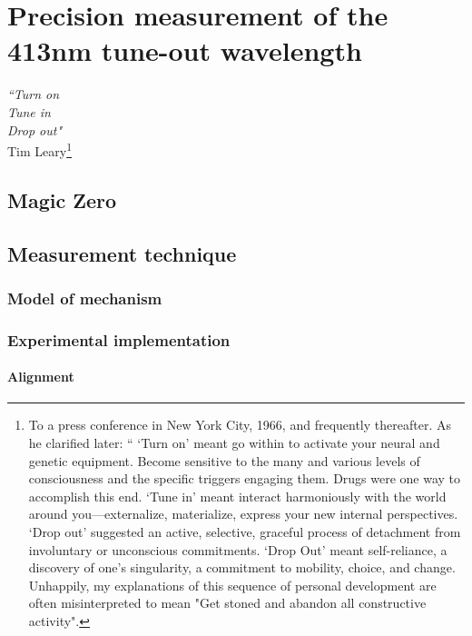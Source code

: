 
\chapter{Precision measurement of the 413nm tune-out wavelength}
\label{chap:tuneout}

\begin{adjustwidth}{3cm}{0cm}
\begin{flushright}
{\emph{``Turn on\\
		Tune in\\
		Drop out"\\} 
Tim Leary\footnote{To a press conference in New York City, 1966, and frequently thereafter.
	As he clarified later: `` `Turn on' meant go within to activate your neural and genetic equipment.
	Become sensitive to the many and various levels of consciousness and the specific triggers engaging them.
	Drugs were one way to accomplish this end.
	`Tune in' meant interact harmoniously with the world around you—externalize, materialize, express your new internal perspectives.
	`Drop out' suggested an active, selective, graceful process of detachment from involuntary or unconscious commitments.
	`Drop Out' meant self-reliance, a discovery of one's singularity, a commitment to mobility, choice, and change.
	Unhappily, my explanations of this sequence of personal development are often misinterpreted to mean "Get stoned and abandon all constructive activity".}}
\end{flushright}
\end{adjustwidth}

\section{Magic Zero}\label{sec:to-history}
\section{Measurement technique}\label{sec:to-method}
\subsection{Model of mechanism}\label{ssec:to-model}
\subsection{Experimental implementation}\label{ssec:to-expt}
\subsubsection*{Alignment}
